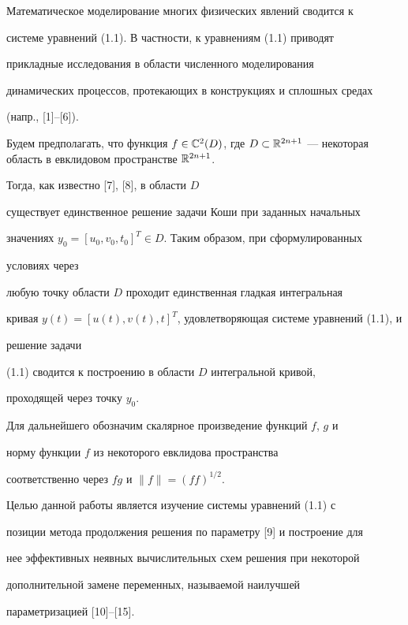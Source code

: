  


Математическое моделирование многих физических явлений сводится к 


системе уравнений (1.1). В частности, к уравнениям (1.1) приводят 


прикладные исследования в области численного моделирования 


динамических процессов, протекающих в конструкциях и сплошных средах 


(напр., [1]--[6]). 


 


Будем предполагать, что функция $f\in\Bbb C^2(D)$, где $D\subset\Bbb 


R^{2n+1}$ --- некоторая область в евклидовом пространстве $\Bbb R^{2n+1}$. 


Тогда, как известно [7], [8], в области $D$ 


существует единственное решение задачи Коши при заданных начальных 


значениях $y_0=[u_0,v_0,t_0]^T\in D$. Таким образом, при сформулированных 


условиях через 


любую точку области $D$ проходит единственная гладкая интегральная 


кривая $y(t)=[u(t),v(t),t]^T$, удовлетворяющая системе уравнений (1.1), и 


решение задачи 


(1.1) сводится к построению в области $D$ интегральной кривой, 


проходящей через точку $y_0$. 


 


Для дальнейшего обозначим скалярное произведение функций $f$, $g$ и 


норму функции $f$ из некоторого евклидова пространства 


соответственно через $fg$ и $\|f\|=(ff)^{1/2}$. 


 


Целью данной работы является изучение системы уравнений (1.1) с 


позиции метода продолжения решения по параметру [9] и построение для 


нее эффективных неявных вычислительных схем решения при некоторой 


дополнительной замене переменных, называемой наилучшей 


параметризацией [10]--[15]. 


